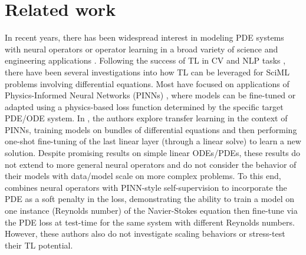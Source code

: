 \section{Related work}
\label{sec:related work}
In recent years, there has been widespread interest in modeling PDE systems with neural operators or operator learning in a broad variety of science and engineering applications \cite{lu2021learning,li2020fourier,kovachki2021neural,rahman2022u,Lu_2022,pathak2022fourcastnet,khoo2021solving,bhattacharya2021model,wen2022u,boulle2023learning,li2022fourier,kissas2022learning}. 
Following the success of TL in CV and NLP tasks \cite{yosinski2014transferable,saito2018maximum,weiss2016survey,ganin2016domain,oquab2014learning,raffel2020exploring,houlsby2019parameter,MM20_SDM}, there have been several investigations into how TL can be leveraged for SciML problems involving differential equations.  
Most have focused on applications of Physics-Informed Neural Networks (PINNs) \cite{mattheakis2021unsupervised,hanna2021residual,goswami2020transfer,chen2021transfer,HAGHIGHAT2021113741,guo2022analysis,xu2023transfer,gao2022svd, desai2021one, li2021physics}, where models can be fine-tuned or adapted using a physics-based loss function determined by the specific target PDE/ODE system. 
In \cite{desai2021one}, the authors explore transfer learning in the context of PINNs, training models on bundles of differential equations and then performing one-shot fine-tuning of the last linear layer (through a linear solve) to learn a new solution. 
Despite promising results on simple linear ODEs/PDEs, these results do not extend to more general neural operators and do not consider the behavior of their models with data/model scale on more complex problems. 
To this end, \cite{li2021physics} combines neural operators with PINN-style self-supervision to incorporate the PDE as a soft penalty in the loss, demonstrating the ability to train a model on one instance (Reynolds number) of the Navier-Stokes equation then fine-tune via the  PDE loss at test-time for the same system with different Reynolds numbers. 
However, these authors also do not investigate scaling behaviors or stress-test their TL potential.

